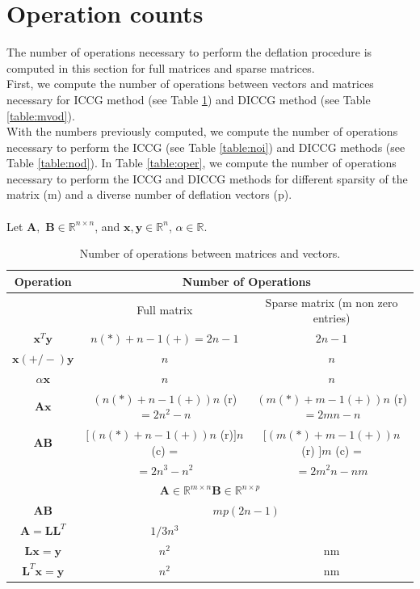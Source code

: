 \documentclass[12pt]{article}
\begin{document}
\section{Operation counts}\label{a5}
The number of operations necessary to perform the deflation procedure is computed in this section for full matrices and sparse matrices.\\
First, we compute the number of operations between vectors and matrices necessary for ICCG method (see Table \ref{table:mvo}) and DICCG method (see Table \ref{table:mvod}). \\
With the numbers previously computed, we compute the number of operations necessary to perform the ICCG (see Table \ref{table:noi}) and DICCG methods (see Table \ref{table:nod}).  
In Table \ref{table:oper}, we compute the number of operations necessary to perform the ICCG and DICCG methods for different sparsity of the matrix (m) and a diverse number of deflation vectors (p).\\\\
Let $\mathbf{A},$ $\mathbf{B}\in \mathbb{R}^{n\times n}$, and $\mathbf{x},\mathbf{y}\in \mathbb{R}^{n}$, $\alpha\in \mathbb{R}$.
 \renewcommand{\arraystretch}{1.3}
 
 \begin{table}[!h]
\begin{tabular}{ |c|c|c| } 
\hline
Operation&\multicolumn{2}{c|}{Number of Operations}\\
\hline
&Full matrix&Sparse matrix (m non zero entries)\\
\hline
$\mathbf{x}^T\mathbf{y}$&$n(*) + n-1(+)= 2n - 1$&$ 2n - 1$\\
\hline
$\mathbf{x}(+/-)\mathbf{y}$&$n$ &$n$\\
\hline
$\alpha\mathbf{x}$&$n$ &$n$\\
\hline
$\mathbf{A}\mathbf{x}$ & $(n(*) + n-1(+)) n $ (r)  $= 2n^2 - n$ &$(m(*) + m-1(+)) n$ (r) $= 2mn - n$ \\
\hline
$\mathbf{A}\mathbf{B}$ & $[(n(*) + n-1(+)) n $ (r)$]n$ (c) = &$[(m(*) + m-1(+)) n$ (r) $]m$ (c) =\\
 & $= 2n^3 - n^2$  &$= 2m^2n - nm$ \\
\hline
\multicolumn{3}{|c|}{$\mathbf{A} \in \mathbb{R}^{m\times n} \mathbf{B}\in \mathbb{R}^{n\times p}$} \\
\hline
$\mathbf{A}\mathbf{B}$ & \multicolumn{2}{c|}{$mp(2n-1)$}  \\
\hline
$\mathbf{A}=\mathbf{L}\mathbf{L}^T$&$1/3n^3$&\\
\hline
 $\mathbf{L}\mathbf{x}=\mathbf{y}$& $n^2$ &nm\\
\hline
$\mathbf{L}^T\mathbf{x}=\mathbf{y}$& $n^2$ &nm\\
\hline

\end{tabular}\caption{Number of operations between matrices and vectors.}\label{table:mvo}
\end{table}
\end{document}
